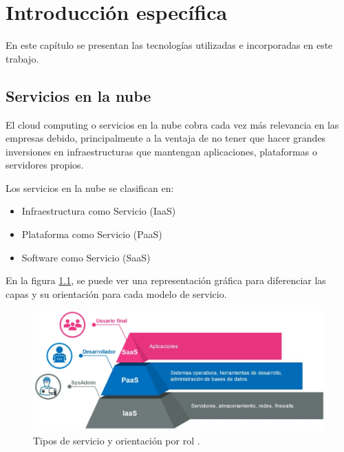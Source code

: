 \chapter{Introducción específica} %

\label{Chapter2}

En este capítulo se presentan las tecnologías utilizadas e incorporadas en este trabajo. 


\section{Servicios en la nube}
El cloud computing o servicios en la nube cobra cada vez más relevancia en las empresas debido, principalmente a la ventaja de no tener que hacer grandes inversiones en infraestructuras que mantengan aplicaciones, plataformas o servidores propios.

Los servicios en la nube se clasifican en:

\begin{itemize}
\item Infraestructura como Servicio (IaaS)
\item Plataforma como Servicio (PaaS)
\item Software como Servicio (SaaS)
\end{itemize}

En la figura \ref{fig:servicios}, se puede ver una representación gráfica para diferenciar las capas y su orientación para cada modelo de servicio.


\begin{figure}[htbp]
	\centering
	\includegraphics[width=.9\textwidth]{./Figures/servicios.png}
	\caption{Tipos de servicio y orientación por rol \protect\footnotemark.}

	\label{fig:servicios}
\end{figure}

